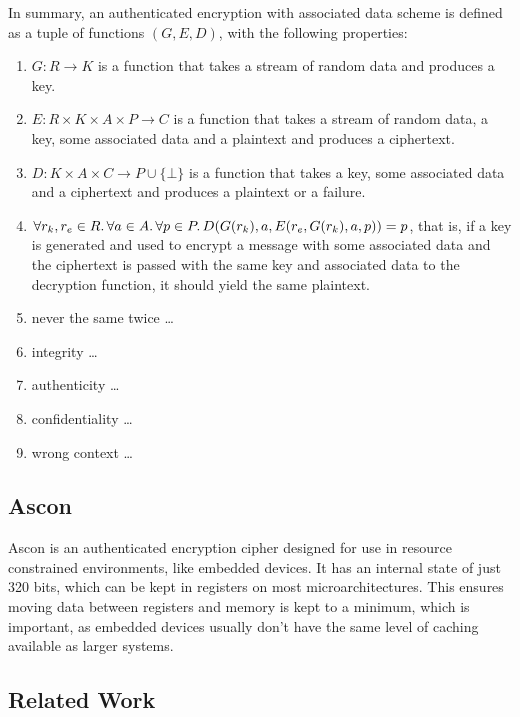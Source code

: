 In summary, an authenticated encryption with associated data scheme is defined
as a tuple of functions $(G, E, D)$, with the following properties:

\begin{enumerate}
    \item $G \colon R \to K$ is a function that takes a stream of random data and
        produces a key.
    \item $E \colon R \times K \times A \times P \to C$ is a function that takes
        a stream of random data, a key, some associated data and a plaintext and
        produces a ciphertext.
    \item $D \colon K \times A \times C \to P \cup \{ \bot \}$ is a function
        that takes a key, some associated data and a ciphertext and produces a
        plaintext or a failure.
    \item $\forall r_k, r_e \in R\ldotp \forall a \in A\ldotp
        \forall p \in P\ldotp D(G(r_k), a, E(r_e, G(r_k), a, p)) = p$, that is,
        if a key is generated and used to encrypt a message with some associated
        data and the ciphertext is passed with the same key and associated data
        to the decryption function, it should yield the same plaintext.
    \item never the same twice \ldots
    \item integrity \ldots
    \item authenticity \ldots
    \item confidentiality \ldots
    \item wrong context \ldots
\end{enumerate}

\subsection{Ascon}

Ascon\cite{ascon} is an authenticated encryption cipher designed for use in
resource constrained environments, like embedded devices. It has an internal
state of just 320 bits, which can be kept in registers on most
microarchitectures. This ensures moving data between registers and memory is
kept to a minimum, which is important, as embedded devices usually don't have
the same level of caching available as larger systems.

\subsection{Related Work}
